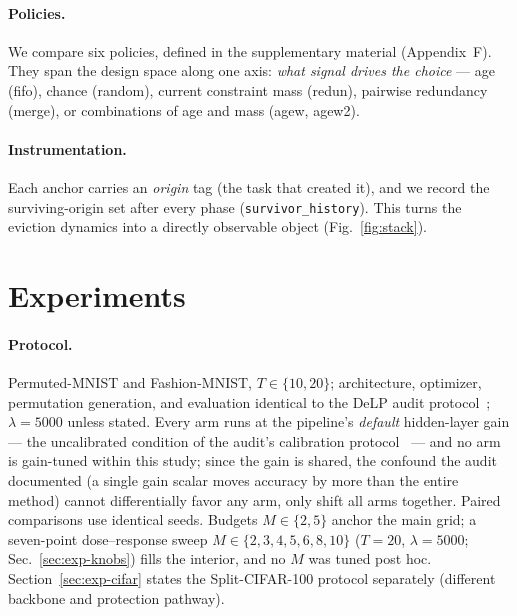 \documentclass[review,11pt,number]{elsarticle}
\newcommand{\delp}{DeLP}
\begin{document}
\paragraph{Policies.}
We compare six policies, defined in the supplementary material
(Appendix~F). They
span the design space along one axis: \emph{what signal drives the
choice} --- age (fifo), chance (random), current constraint mass
(redun), pairwise redundancy (merge), or combinations of age and mass
(agew, agew2).



\begin{sloppypar}
\paragraph{Instrumentation.}
Each anchor carries an \emph{origin} tag (the task that created it),
and we record the surviving-origin set after every phase
(\texttt{survivor\_history}). This turns the eviction dynamics into a
directly observable object (Fig.~\ref{fig:stack}).
\end{sloppypar}

\section{Experiments}
\label{sec:exp}

\paragraph{Protocol.}
Permuted-MNIST and Fashion-MNIST, $T \in \{10, 20\}$; architecture,
optimizer, permutation generation, and evaluation identical to the
\delp{} audit protocol~\cite{zhou2026delp}; $\lambda{=}5000$ unless stated. Every arm runs at the pipeline's
\emph{default} hidden-layer gain --- the uncalibrated condition of the
audit's calibration protocol~\cite{zhou2026delp} --- and no arm is
gain-tuned within this study; since the gain is shared, the confound
the audit documented (a single gain scalar moves accuracy by more than
the entire method) cannot differentially favor any arm, only shift all
arms together. Paired comparisons use identical seeds.
Budgets $M \in \{2, 5\}$ anchor the main grid; a seven-point
dose--response sweep $M \in \{2,3,4,5,6,8,10\}$ ($T{=}20$,
$\lambda{=}5000$; Sec.~\ref{sec:exp-knobs}) fills the interior, and no
$M$ was tuned post hoc.
Section~\ref{sec:exp-cifar} states the Split-CIFAR-100 protocol
separately (different backbone and protection pathway).
\end{document}
